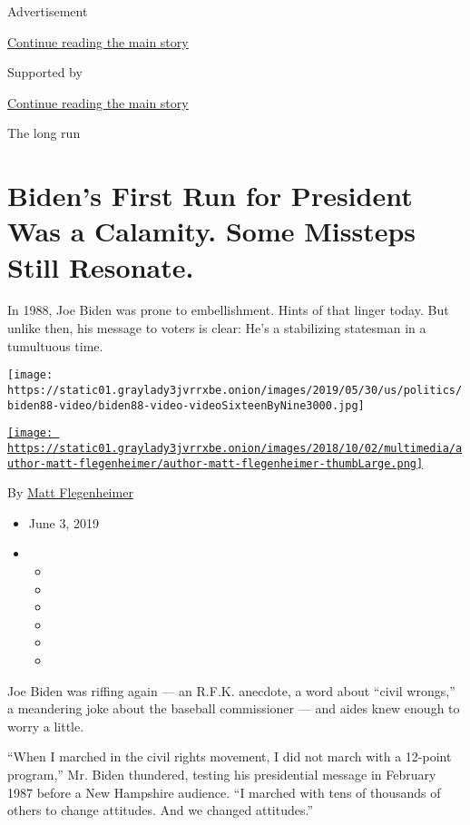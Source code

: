 Advertisement

\protect\hyperlink{after-top}{Continue reading the main story}

Supported by

\protect\hyperlink{after-sponsor}{Continue reading the main story}

The long run

\hypertarget{bidens-first-run-for-president-was-a-calamity-some-missteps-still-resonate}{%
\section{Biden's First Run for President Was a Calamity. Some Missteps
Still
Resonate.}\label{bidens-first-run-for-president-was-a-calamity-some-missteps-still-resonate}}

In 1988, Joe Biden was prone to embellishment. Hints of that linger
today. But unlike then, his message to voters is clear: He's a
stabilizing statesman in a tumultuous time.

\texttt{[image: https://static01.graylady3jvrrxbe.onion/images/2019/05/30/us/politics/biden88-video/biden88-video-videoSixteenByNine3000.jpg]}

\href{https://www.nytimes3xbfgragh.onion/by/matt-flegenheimer}{\texttt{[image: https://static01.graylady3jvrrxbe.onion/images/2018/10/02/multimedia/author-matt-flegenheimer/author-matt-flegenheimer-thumbLarge.png]}}

By \href{https://www.nytimes3xbfgragh.onion/by/matt-flegenheimer}{Matt
Flegenheimer}

\begin{itemize}
\item
  June 3, 2019
\item
  \begin{itemize}
  \item
  \item
  \item
  \item
  \item
  \item
  \end{itemize}
\end{itemize}

Joe Biden was riffing again --- an R.F.K. anecdote, a word about ``civil
wrongs,'' a meandering joke about the baseball commissioner --- and
aides knew enough to worry a little.

``When I marched in the civil rights movement, I did not march with a
12-point program,'' Mr. Biden thundered, testing his presidential
message in February 1987 before a New Hampshire audience. ``I marched
with tens of thousands of others to change attitudes. And we changed
attitudes.''

